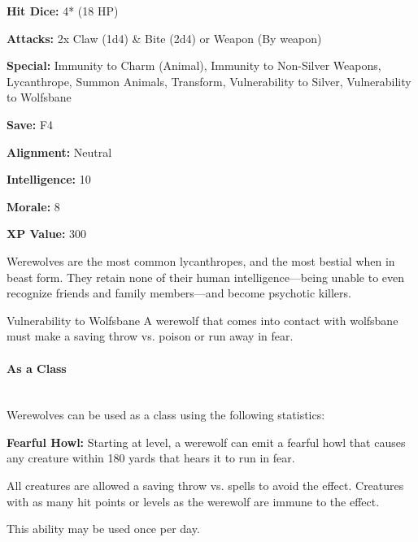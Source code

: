 \begin{multicols*}{2}
{\textbf{Hit Dice:} 4* (18 HP)

\textbf{Attacks:} 2x Claw (1d4) \& Bite (2d4) or Weapon (By weapon)

\textbf{Special:} Immunity to Charm (Animal), Immunity to Non-Silver Weapons, Lycanthrope, Summon Animals, Transform, Vulnerability to Silver, Vulnerability to Wolfsbane

\textbf{Save:} F4

\textbf{Alignment:} Neutral

\textbf{Intelligence:} 10

\textbf{Morale:} 8

\textbf{XP Value:} 300}

Werewolves are the most common lycanthropes, and the most bestial when in beast form. They retain none of their human intelligence—being unable to even recognize friends and family members—and become psychotic killers.

Vulnerability to Wolfsbane A werewolf that comes into contact with wolfsbane must make a saving throw vs. poison or run away in fear.

\paragraph{As a Class}\mbox{}\\
Werewolves can be used as a class using the following statistics:

\textbf{Fearful Howl:} Starting at  level, a werewolf can emit a fearful howl that causes any creature within 180 yards that hears it to run in fear.

All creatures are allowed a saving throw vs. spells to avoid the effect. Creatures with as many hit points or levels as the werewolf are immune to the effect.

This ability may be used once per day.

\end{multicols*}
